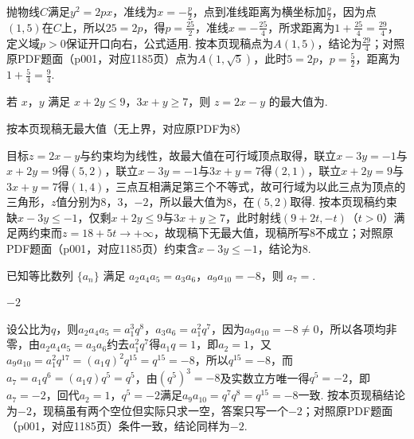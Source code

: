 \begin{solution}
抛物线\(C\)满足\(y^{2}=2px\)，准线为\(x=-\frac{p}{2}\)，点到准线距离为横坐标加\(\frac{p}{2}\)，因为点\(\left(1,5\right)\)在\(C\)上，所以\(25=2p\)，得\(p=\frac{25}{2}\)，准线\(x=-\frac{25}{4}\)，所求距离为\(1+\frac{25}{4}=\frac{29}{4}\)，定义域\(p>0\)保证开口向右，公式适用. 按本页现稿点为\(A\left(1,5\right)\)，结论为\(\frac{29}{4}\)；对照原PDF题面（p001，对应1185页）点为\(A\left(1,\sqrt{5}\right)\)，此时\(5=2p\)，\(p=\frac{5}{2}\)，距离为\(1+\frac{5}{4}=\frac{9}{4}\).
\end{solution}

\begin{problem}
若 \(x\)，\(y\) 满足 \(x+2y\le 9\)，\(3x+y\ge 7\)，则 \(z=2x-y\) 的最大值为\fillinblank{}.
\end{problem}

\begin{answer}
按本页现稿无最大值（无上界，对应原PDF为\(8\)）
\end{answer}

\begin{solution}
目标\(z=2x-y\)与约束均为线性，故最大值在可行域顶点取得，联立\(x-3y=-1\)与\(x+2y=9\)得\(\left(5,2\right)\)，联立\(x-3y=-1\)与\(3x+y=7\)得\(\left(2,1\right)\)，联立\(x+2y=9\)与\(3x+y=7\)得\(\left(1,4\right)\)，三点互相满足第三个不等式，故可行域为以此三点为顶点的三角形，\(z\)值分别为\(8\)，\(3\)，\(-2\)，所以最大值为\(8\)，在\(\left(5,2\right)\)取得. 按本页现稿约束缺\(x-3y\le-1\)，仅剩\(x+2y\le9\)与\(3x+y\ge7\)，此时射线\(\left(9+2t,-t\right)\)（\(t>0\)）满足两约束而\(z=18+5t\to+\infty\)，故现稿下无最大值，现稿所写\(8\)不成立；对照原PDF题面（p001，对应1185页）约束含\(x-3y\le-1\)，结论为\(8\).
\end{solution}

\begin{problem}
已知等比数列 \(\{a_n\}\) 满足 \(a_2a_4a_5=a_3a_6\)，\(a_9a_{10}=-8\)，则 \(a_7=\)\fillinblank{}.
\end{problem}

\begin{answer}
\(-2\)
\end{answer}

\begin{solution}
设公比为\(q\)，则\(a_{2}a_{4}a_{5}=a_{1}^{3}q^{8}\)，\(a_{3}a_{6}=a_{1}^{2}q^{7}\)，因为\(a_{9}a_{10}=-8\ne0\)，所以各项均非零，由\(a_{2}a_{4}a_{5}=a_{3}a_{6}\)约去\(a_{1}^{2}q^{7}\)得\(a_{1}q=1\)，即\(a_{2}=1\)，又\(a_{9}a_{10}=a_{1}^{2}q^{17}=\left(a_{1}q\right)^{2}q^{15}=q^{15}=-8\)，所以\(q^{15}=-8\)，而\(a_{7}=a_{1}q^{6}=\left(a_{1}q\right)q^{5}=q^{5}\)，由\(\left(q^{5}\right)^{3}=-8\)及实数立方唯一得\(q^{5}=-2\)，即\(a_{7}=-2\)，回代\(a_{2}=1\)，\(q^{5}=-2\)满足\(a_{9}a_{10}=q^{7}q^{8}=q^{15}=-8\)一致. 按本页现稿结论为\(-2\)，现稿虽有两个空位但实际只求一空，答案只写一个\(-2\)；对照原PDF题面（p001，对应1185页）条件一致，结论同样为\(-2\).
\end{solution}


